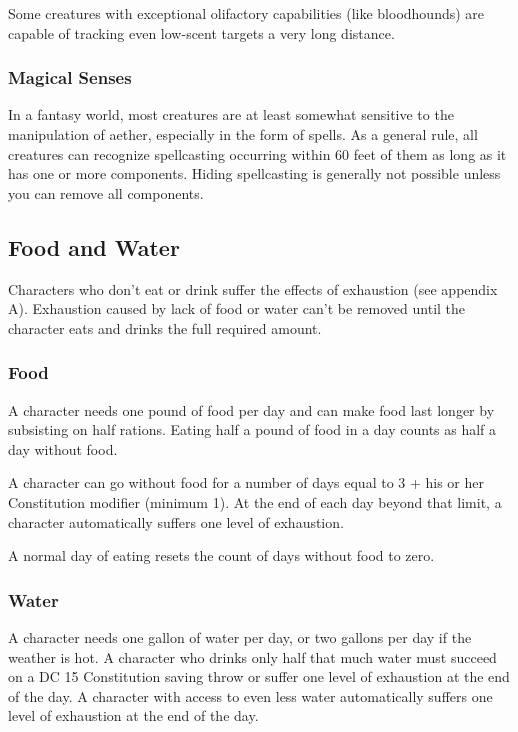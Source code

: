 Some creatures with exceptional olifactory capabilities (like bloodhounds) are capable of tracking even low-scent targets a very long distance.

\subsubsection{Magical Senses}
In a fantasy world, most creatures are at least somewhat sensitive to the manipulation of aether, especially in the form of spells. As a general rule, all creatures can recognize spellcasting occurring within 60 feet of them as long as it has one or more components. Hiding spellcasting is generally not possible unless you can remove all components.

\subsection{Food and Water}

Characters who don't eat or drink suffer the effects of exhaustion (see appendix A). Exhaustion caused by lack of food or water can't be removed until the character eats and drinks the full required amount.

\subsubsection{Food}

A character needs one pound of food per day and can make food last longer by subsisting on half rations. Eating half a pound of food in a day counts as half a day without food.

A character can go without food for a number of days equal to 3 + his or her Constitution modifier (minimum 1). At the end of each day beyond that limit, a character automatically suffers one level of exhaustion.

A normal day of eating resets the count of days without food to zero.

\subsubsection{Water}

A character needs one gallon of water per day, or two gallons per day if the weather is hot. A character who drinks only half that much water must succeed on a DC 15 Constitution saving throw or suffer one level of exhaustion at the end of the day. A character with access to even less water automatically suffers one level of exhaustion at the end of the day.

